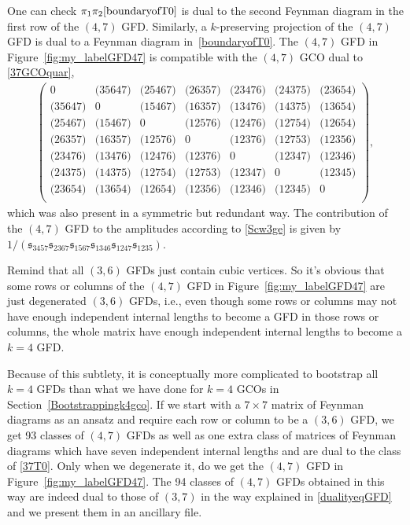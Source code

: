 \documentclass[pdftex]{sigma}
\def \s {\sigma}
\theoremstyle{definition}
\def \s {\mathfrak{s}}
\numberwithin{equation}{section}
\begin{document}
One can check $\pi_1\pi_2\eqref{boundaryofT0}$ is dual to the second Feynman diagram in the first row of the $(4,7)$ GFD. Similarly, a $k$-preserving projection of the $(4,7)$ GFD is dual to a Feynman diagram in~\eqref{boundaryofT0}.
The $(4,7)$ GFD in Figure~\ref{fig:my_labelGFD47}
is compatible with the $(4,7)$ GCO
 dual to \eqref{37GCOquar},
 \begin{align*}
\left(
\begin{matrix}
 0 & \text{(35647)} & \text{(25467)} & \text{(26357)} & \text{(23476)} & \text{(24375)} & \text{(23654)} \\
 \text{(35647)} & 0 & \text{(15467)} & \text{(16357)} & \text{(13476)} & \text{(14375)} & \text{(13654)} \\
 \text{(25467)} & \text{(15467)} & 0 & \text{(12576)} & \text{(12476)} & \text{(12754)} & \text{(12654)} \\
 \text{(26357)} & \text{(16357)} & \text{(12576)} & 0 & \text{(12376)} & \text{(12753)} & \text{(12356)} \\
 \text{(23476)} & \text{(13476)} & \text{(12476)} & \text{(12376)} & 0 & \text{(12347)} & \text{(12346)} \\
 \text{(24375)} & \text{(14375)} & \text{(12754)} & \text{(12753)} & \text{(12347)} & 0 & \text{(12345)} \\
 \text{(23654)} & \text{(13654)} & \text{(12654)} & \text{(12356)} & \text{(12346)} & \text{(12345)} & 0 \\
\end{matrix}
\right),
 \end{align*}
which was also present in a symmetric but redundant way. The contribution of the $(4,7)$ GFD to the amplitudes according to \eqref{Scw3ge} is given by $ {1}/({\s_{3457} \s_{2367} \s_{1567} \s_{1346} \s_{1247} \s_{1235}})$.

Remind that all $(3,6)$ GFDs just contain cubic vertices. So
it's obvious that some rows or columns of the $(4,7)$ GFD in Figure~\ref{fig:my_labelGFD47} are just degenerated $(3,6)$ GFDs, i.e., even though some rows or columns may not have enough independent internal lengths to become a GFD in those rows or columns, the whole matrix have enough independent internal lengths to become a $k=4$ GFD.

Because of this subtlety, it is conceptually more complicated to bootstrap all $k=4$ GFDs than what we have done for $k=4$ GCOs in Section~\ref{Bootstrappingk4gco}.
If we start with a $7\times 7$ matrix of Feynman diagrams as an ansatz and require each row or column to be a $(3,6)$ GFD, we get 93 classes of $(4,7)$ GFDs as well as one extra class of matrices of Feynman diagrams which have seven independent internal lengths and are dual to the class of \eqref{37T0}. Only when we degenerate it, do we get the $(4,7)$ GFD in Figure~\ref{fig:my_labelGFD47}. The 94 classes of $(4,7)$ GFDs obtained in this way are indeed dual to those of $(3,7)$ in the way explained in \eqref{dualityeqGFD} and we present them in an ancillary file.
\end{document}
